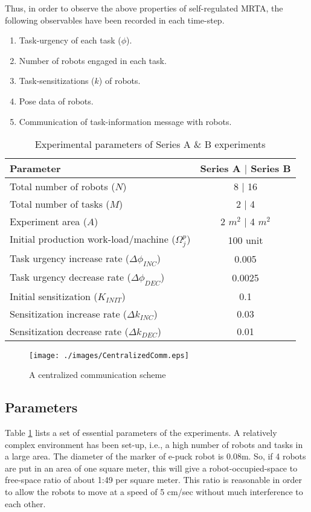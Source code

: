 Thus, in order to observe the above properties of self-regulated MRTA, the following  observables have been recorded in each time-step.
\begin{enumerate}
\item Task-urgency of each task ($\phi$).
\item Number of robots engaged in each task.
\item Task-sensitizations ($k$) of robots.
\item Pose data of robots.
\item Communication of task-information message with robots.  
\end{enumerate}
\begin{table}
\caption{Experimental parameters of Series A \& B experiments}
\label{table:params}
\begin{center}
\begin{tabular}{|l|c|}
\hline Parameter & Series A $\mid$ Series B\\
\hline Total number of robots ($N$) & \hspace*{0.1cm} 8 $\mid$ 16\\
\hline Total number of tasks ($M$) & 2 $\mid$ 4\\
\hline Experiment area ($A$) & 2 $m^2$ $\mid$  4 $m^2$\\
\hline Initial production work-load/machine ($\Omega_{j}^{p}$) & 100 unit \\
\hline Task urgency increase rate ($\Delta\phi_{INC}$) & 0.005\\
\hline Task urgency decrease rate ($\Delta\phi_{DEC}$) & 0.0025\\
\hline Initial sensitization ($K_{INIT}$) & 0.1\\
\hline Sensitization increase rate ($\Delta k_{INC}$) & 0.03\\
\hline Sensitization decrease rate ($\Delta k_{DEC}$) & 0.01\\
\hline
\end{tabular}
\end{center}
\end{table}
\begin{figure}
\centering
\texttt{[image: ./images/CentralizedComm.eps]}
\caption{\small A centralized communication scheme} %
\label{fig:ccm} %
\end{figure}
\subsection{Parameters}
Table \ref{table:params} lists a set of essential parameters of the experiments. A relatively complex environment has been set-up, i.e., a high number of robots and tasks in a large area. The diameter of the marker of e-puck robot is 0.08m. So, if 4 robots are put in an area of one square meter, this will give a robot-occupied-space to free-space ratio of about 1:49 per square meter. This ratio is reasonable in order to allow the robots to move at a speed of 5 cm/sec without much interference to each other. 

